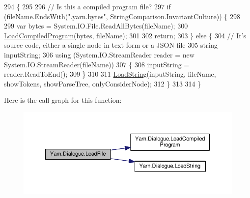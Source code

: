 \begin{DoxyCode}
294                                                                                                            
                            \{
295 
296             \textcolor{comment}{// Is this a compiled program file?}
297             \textcolor{keywordflow}{if} (fileName.EndsWith(\textcolor{stringliteral}{".yarn.bytes"}, StringComparison.InvariantCulture)) \{
298 
299                 var bytes = System.IO.File.ReadAllBytes(fileName);
300                 \hyperlink{a00090_a4bc1ceca26754dc3ec0a2281dfee26ce}{LoadCompiledProgram}(bytes, fileName);
301 
302                 \textcolor{keywordflow}{return};
303             \} \textcolor{keywordflow}{else} \{
304                 \textcolor{comment}{// It's source code, either a single node in text form or a JSON file}
305                 \textcolor{keywordtype}{string} inputString;
306                 \textcolor{keyword}{using} (System.IO.StreamReader reader = \textcolor{keyword}{new} System.IO.StreamReader(fileName))
307                 \{
308                     inputString = reader.ReadToEnd();
309                 \}
310 
311                 \hyperlink{a00090_a7b66187877ec8a2bfee2298d3dd16706}{LoadString}(inputString, fileName, showTokens, showParseTree, onlyConsiderNode);
312             \}
313 
314         \}
\end{DoxyCode}


Here is the call graph for this function\-:
\nopagebreak
\begin{figure}[H]
\begin{center}
\leavevmode
\includegraphics[width=350pt]{a00090_af868f7f6928d122ca1d1857be433d92b_cgraph}
\end{center}
\end{figure}


